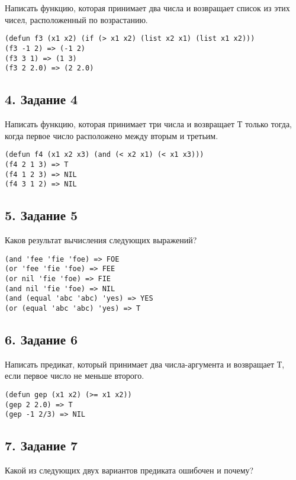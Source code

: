 Написать функцию, которая принимает два числа и возвращает список из этих чисел, расположенный по возрастанию.

\begin{lstlisting}
(defun f3 (x1 x2) (if (> x1 x2) (list x2 x1) (list x1 x2)))
(f3 -1 2) => (-1 2)
(f3 3 1) => (1 3)
(f3 2 2.0) => (2 2.0)
\end{lstlisting}

\subsection*{4. Задание 4}

Написать функцию, которая принимает три числа и возвращает Т только тогда, когда первое число расположено между вторым и третьим.
\begin{lstlisting}
(defun f4 (x1 x2 x3) (and (< x2 x1) (< x1 x3)))
(f4 2 1 3) => T
(f4 1 2 3) => NIL
(f4 3 1 2) => NIL
\end{lstlisting}

\subsection*{5. Задание 5}

Каков результат вычисления следующих выражений?

\begin{lstlisting}
(and 'fee 'fie 'foe) => FOE
(or 'fee 'fie 'foe) => FEE
(or nil 'fie 'foe) => FIE
(and nil 'fie 'foe) => NIL
(and (equal 'abc 'abc) 'yes) => YES
(or (equal 'abc 'abc) 'yes) => T
\end{lstlisting}

\subsection*{6. Задание 6}

Написать предикат, который принимает два числа-аргумента и возвращает Т, если первое число не меньше второго.

\begin{lstlisting}
(defun gep (x1 x2) (>= x1 x2))
(gep 2 2.0) => T
(gep -1 2/3) => NIL
\end{lstlisting}

\subsection*{7. Задание 7}

Какой из следующих двух вариантов предиката ошибочен и почему?


